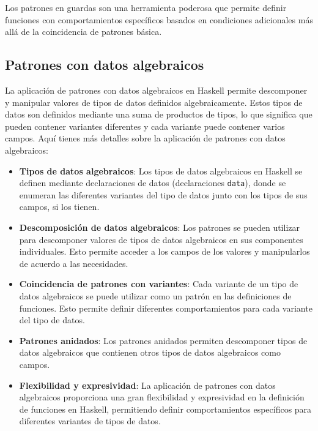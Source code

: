 \documentclass{article}
\begin{document}
Los patrones en guardas son una herramienta poderosa que permite definir funciones con comportamientos específicos basados en condiciones adicionales más allá de la coincidencia de patrones básica.

\subsection{Patrones con datos algebraicos}

La aplicación de patrones con datos algebraicos en Haskell permite descomponer y manipular valores de tipos de datos definidos algebraicamente. Estos tipos de datos son definidos mediante una suma de productos de tipos, lo que significa que pueden contener variantes diferentes y cada variante puede contener varios campos. Aquí tienes más detalles sobre la aplicación de patrones con datos algebraicos:

\begin{itemize}
    \item \textbf{Tipos de datos algebraicos}: Los tipos de datos algebraicos en Haskell se definen mediante declaraciones de datos (declaraciones \texttt{data}), donde se enumeran las diferentes variantes del tipo de datos junto con los tipos de sus campos, si los tienen.
    
    \item \textbf{Descomposición de datos algebraicos}: Los patrones se pueden utilizar para descomponer valores de tipos de datos algebraicos en sus componentes individuales. Esto permite acceder a los campos de los valores y manipularlos de acuerdo a las necesidades.
    
    \item \textbf{Coincidencia de patrones con variantes}: Cada variante de un tipo de datos algebraicos se puede utilizar como un patrón en las definiciones de funciones. Esto permite definir diferentes comportamientos para cada variante del tipo de datos.
    
    \item \textbf{Patrones anidados}: Los patrones anidados permiten descomponer tipos de datos algebraicos que contienen otros tipos de datos algebraicos como campos.
    
    \item \textbf{Flexibilidad y expresividad}: La aplicación de patrones con datos algebraicos proporciona una gran flexibilidad y expresividad en la definición de funciones en Haskell, permitiendo definir comportamientos específicos para diferentes variantes de tipos de datos.
\end{itemize}
\end{document}
